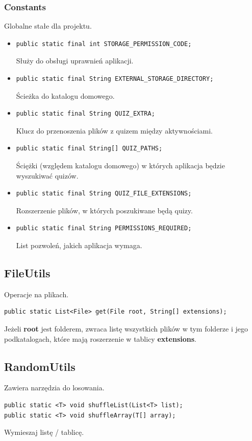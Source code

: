 \documentclass[12pt, a4paper]{article}
\begin{document}
\subsubsection{Constants}
Globalne stałe dla projektu.
\begin{itemize}
\item\begin{lstlisting}
public static final int STORAGE_PERMISSION_CODE;
\end{lstlisting}
Służy do obsługi uprawnień aplikacji.
\item\begin{lstlisting}
public static final String EXTERNAL_STORAGE_DIRECTORY;
\end{lstlisting}
Ścieżka do katalogu domowego.
\item\begin{lstlisting}
public static final String QUIZ_EXTRA;
\end{lstlisting}
Klucz do przenoszenia plików z quizem między aktywnościami.
\item\begin{lstlisting}
public static final String[] QUIZ_PATHS;
\end{lstlisting}
Ściężki (względem katalogu domowego) w których aplikacja będzie wyszukiwać quizów.
\item\begin{lstlisting}
public static final String QUIZ_FILE_EXTENSIONS;
\end{lstlisting}
Rozszerzenie plików, w których poszukiwane będą quizy.
\item\begin{lstlisting}
public static final String PERMISSIONS_REQUIRED;
\end{lstlisting}
List pozwoleń, jakich aplikacja wymaga.
\end{itemize}

\subsection{FileUtils}
Operacje na plikach.
\begin{lstlisting}
public static List<File> get(File root, String[] extensions);
\end{lstlisting}
Jeżeli \textbf{root} jest folderem, zwraca listę wszystkich plików w tym folderze i jego podkatalogach, które mają roszerzenie w tablicy \textbf{extensions}.

\subsection{RandomUtils}
Zawiera narzędzia do losowania.
\begin{lstlisting}
public static <T> void shuffleList(List<T> list);
public static <T> void shuffleArray(T[] array);
\end{lstlisting}
Wymieszaj listę / tablicę.
\end{document}
